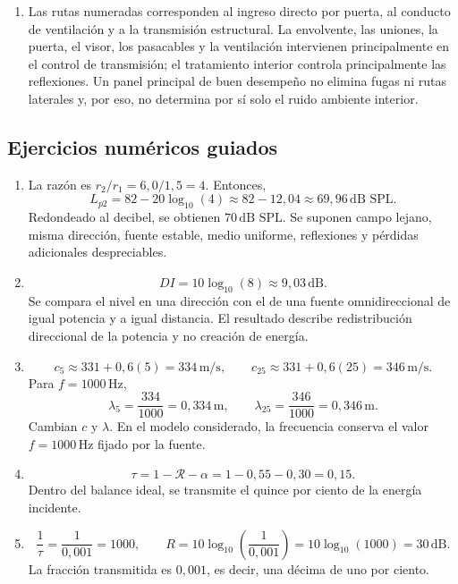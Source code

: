 \begin{enumerate}[label=\textbf{V\arabic*.},leftmargin=*]
    \item Las rutas numeradas corresponden al ingreso directo por puerta,
    al conducto de ventilación y a la transmisión estructural. La envolvente,
    las uniones, la puerta, el visor, los pasacables y la ventilación
    intervienen principalmente en el control de transmisión; el tratamiento
    interior controla principalmente las reflexiones. Un panel principal de
    buen desempeño no elimina fugas ni rutas laterales y, por eso, no
    determina por sí solo el ruido ambiente interior.
\end{enumerate}

\subsection*{Ejercicios numéricos guiados}

\begin{enumerate}[label=\textbf{G\arabic*.},leftmargin=*]
    \item La razón es \(r_2/r_1=6{,}0/1{,}5=4\). Entonces,
    \[
        L_{p2}=82-20\log_{10}(4)
        \approx82-12{,}04
        \approx69{,}96\,\text{dB SPL}.
    \]
    Redondeado al decibel, se obtienen \(70\,\text{dB SPL}\). Se suponen campo
    lejano, misma dirección, fuente estable, medio uniforme, reflexiones y
    pérdidas adicionales despreciables.

    \item
    \[
        DI=10\log_{10}(8)\approx9{,}03\,\text{dB}.
    \]
    Se compara el nivel en una dirección con el de una fuente omnidireccional
    de igual potencia y a igual distancia. El resultado describe
    redistribución direccional de la potencia y no creación de energía.

    \item
    \[
        c_5\approx331+0{,}6(5)=334\,\text{m}/\text{s},
        \qquad
        c_{25}\approx331+0{,}6(25)=346\,\text{m}/\text{s}.
    \]
    Para \(f=1000\,\text{Hz}\),
    \[
        \lambda_5=\frac{334}{1000}=0{,}334\,\text{m},
        \qquad
        \lambda_{25}=\frac{346}{1000}=0{,}346\,\text{m}.
    \]
    Cambian \(c\) y \(\lambda\). En el modelo considerado, la frecuencia
    conserva el valor \(f=1000\,\text{Hz}\) fijado por la fuente.

    \item
    \[
        \tau=1-\mathcal{R}-\alpha
        =1-0{,}55-0{,}30
        =0{,}15.
    \]
    Dentro del balance ideal, se transmite el quince por ciento de la energía
    incidente.

    \item
    \[
        \frac{1}{\tau}=\frac{1}{0{,}001}=1000,
        \qquad
        R=10\log_{10}\!\left(\frac{1}{0{,}001}\right)
        =10\log_{10}(1000)
        =30\,\text{dB}.
    \]
    La fracción transmitida es \(0{,}001\), es decir, una décima de uno por
    ciento.
\end{enumerate}

